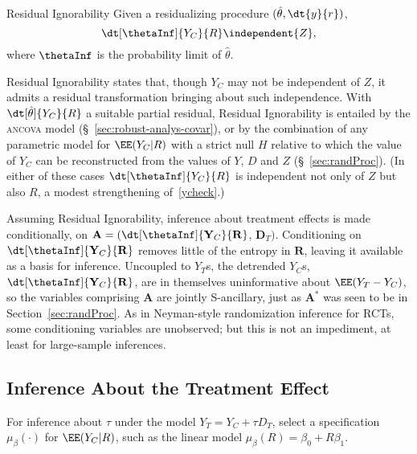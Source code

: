 \begin{ass}{Residual Ignorability}
\sloppy
Given a residualizing procedure $(\hat{\theta}, \dt{y}{r})$,
\begin{equation}\label{ycheck}
\dt[\thetaInf]{Y_{C}}{ R }%
\independent {Z},
\end{equation}
where $\thetaInf$ is the probability limit of $\hat\theta$.
\end{ass}
Residual Ignorability states that, though $Y_C$ may not be independent of
$Z$,  it admits a residual transformation bringing about such
independence.   With $\dt[\hat\theta]{Y_{C}}{ R}$ a suitable
partial residual, Residual Ignorability is entailed by the
\textsc{ancova} model (\S~\ref{sec:robust-analys-covar}), or by the combination of any parametric model
for $\EE (Y_{C}| R)$ with a strict null $H$ relative to which the
value of $Y_{C}$ can be reconstructed from the values of $Y$, $D$ and
$Z$ (\S~\ref{sec:randProc}).
(In either of these cases $\dt[\thetaInf]{Y_{C}}{ R}$
is independent not only of $Z$ but also $R$,
a modest strengthening of~\eqref{ycheck}.)


\sloppy
Assuming Residual Ignorability, inference about treatment effects is
made conditionally, on
$\mathbf{A}= (\dt[\thetaInf]{\mathbf{Y}_{C}}{ \mathbf{R}}$, $\mathbf{D}_{T})$.
Conditioning on
$\dt[\thetaInf]{\mathbf{Y}_{C}}{ \mathbf{R}}$
removes little of the entropy
in $\mathbf{R}$, leaving it available as a basis for inference.
Uncoupled to $Y_{T}$s, the detrended  $Y_{C}$s,
$\dt[\thetaInf]{\mathbf{Y}_{C}}{ \mathbf{R}}$,
are in themselves uninformative about $\EE(Y_{T} - Y_{C})$, so
the variables comprising $\mathbf{A}$ are jointly
S-ancillary, just as $\mathbf{A}^{*}$ was seen to be
in Section~\ref{sec:randProc}.  As in Neyman-style randomization inference for RCTs, some conditioning variables are
unobserved; but this is not an impediment, at least for large-sample
inferences.



\subsection{Inference About the Treatment Effect}
\label{sec:test-hypoth-no}

For inference about $\tau$ under the model
$Y_{T} = Y_{C} + \tau D_{T}$, select a specification
$\mu_{\beta}(\cdot)$ for $\EE(Y_{C}| R)$,
such as the
linear model $\mu_{\beta}(R) =\beta_{0} + R\beta_{1}$.


